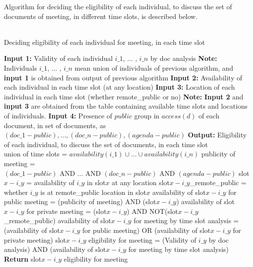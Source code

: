 \documentclass{article}
\begin{document}
Algorithm for deciding the eligibility of each individual, to discuss the set of documents of meeting, in different time slots, is described below.\\ \\
\begin{algorithm}[H]
    \caption{Deciding eligibility of each individual for meeting, in each time slot}
    \begin{algorithmic}
        \State \textbf{Input 1:} Validity of each individual \(i\_1\), ... , \(i\_n\) by doc analysis
        \State \textbf{Note:} Individuals \(i\_1\), ... , \(i\_n\) mean union of individuals of previous algorithm, and \textbf{input 1} is obtained from output of previous algorithm
        \State \textbf{Input 2:} Availability of each individual in each time slot (at any location) 
        \State \textbf{Input 3:} Location of each individual in each time slot (whether remote\_public or no)
        \State \textbf{Note:} \textbf{Input 2} and \textbf{input 3} are obtained from the table containing available time slots and locations of individuals.
        \State \textbf{Input 4:} Presence of \(public\) group in \(access(d)\) of each document, in set of documents, as $(doc\_1-public) , ... , (doc\_n-public) , (agenda-public)$
        \State \textbf{Output:} Eligibility of each individual, to discuss the set of documents, in each time slot \\
        \State union of time slots = \(availability(i\_1) \cup \dots \cup availability(i\_n)\)
                \State publicity of meeting = \((doc\_1-public) \text{ AND } ... \text{ AND } (doc\_n-public) \text{ AND } (agenda-public)\)
                \State slot\(x-i\_y\) = availability of \(i\_y\) in slot\(x\) at any location
                \State slot\(x-i\_y\)\_remote\_public = whether \(i\_y\) is at remote\_public location in slot\(x\) 
                \State availability of slot\(x-i\_y\) for public meeting = (publicity of meeting) AND (slot\(x-i\_y\))
                \State availability of slot\(x-i\_y\) for private meeting = (slot\(x-i\_y\)) AND NOT(slot\(x-i\_y\)\_remote\_public)
                \State availability of slot\(x-i\_y\) for meeting by time slot analysis = (availability of slot\(x-i\_y\) for public meeting) OR (availability of slot\(x-i\_y\) for private meeting)
                \State slot\(x-i\_y\) eligibility for meeting = (Validity of \(i\_y\) by doc analysis) AND (availability of slot\(x-i\_y\) for meeting by time slot analysis)
            \EndFor
            \State \textbf{Return} slot\(x-i\_y\) eligibility for meeting
        \EndFor
    \end{algorithmic}
\end{algorithm}
\end{document}

